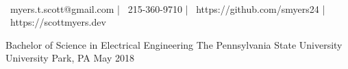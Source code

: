 \documentclass[]{awesome-cv}
\begin{document}
    
\begin{center}
	  \\
	\vspace{1mm}
	{\faEnvelope\ myers.t.scott@gmail.com} | {\faMobile\ 215-360-9710} | {\faLink\ https://github.com/smyers24} | {\faLink\ https://scottmyers.dev}
\end{center}
\begin{cventries}
	\cventry
	{Bachelor of Science in Electrical Engineering}
	{The Pennsylvania State University}
	{University Park, PA}
	{May 2018}
	{}
\end{cventries}
\end{document}
